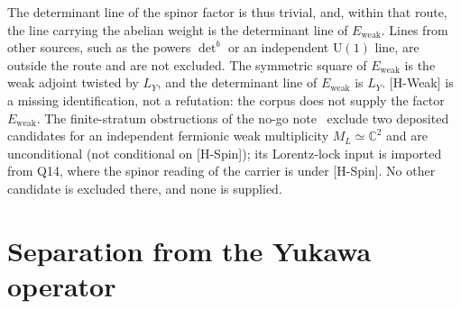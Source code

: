 \documentclass[11pt]{article}
\theoremstyle{definition}
\theoremstyle{remark}
\newcommand{\Ew}{E_{\mathrm{weak}}}
\newcommand{\LY}{L_{Y}}
\newcommand{\UU}{\mathrm{U}}
\begin{document}
    The determinant line of the spinor factor is thus trivial, and, within that route, the line carrying the abelian
    weight is the determinant line of $\Ew$.
    Lines from other sources, such as the powers $\det^{b}$ or an independent $\UU(1)$ line, are outside the route and
    are not excluded.
    The symmetric square of $\Ew$ is the weak adjoint twisted by $\LY$, and the determinant line of $\Ew$ is $\LY$.
    [H-Weak] is a missing identification, not a refutation: the corpus does not supply the factor $\Ew$.
    The finite-stratum obstructions of the no-go note~\cite{Beau2026nsr} exclude two deposited candidates for an
    independent fermionic weak multiplicity $M_{L} \simeq \mathbb{C}^{2}$ and are unconditional (not conditional on
    [H-Spin]); its Lorentz-lock input is imported from Q14, where the spinor reading of the carrier is under [H-Spin].
    No other candidate is excluded there, and none is supplied.

  \section{Separation from the Yukawa operator}
    \label{sec:separation}
\end{document}

